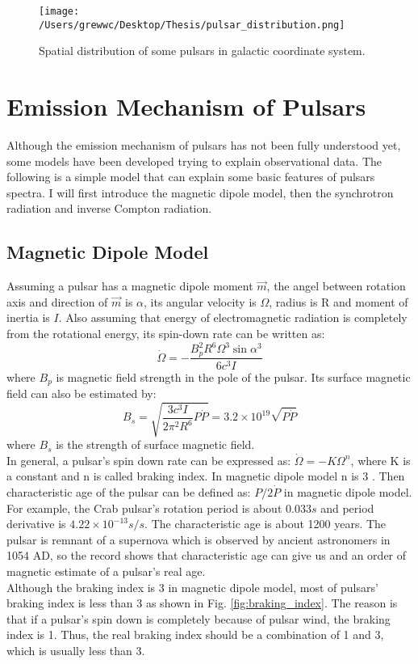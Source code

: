 \documentclass[12pt]{report}
\begin{document}
    \begin{figure}[h]
      \centering
      \texttt{[image: /Users/grewwc/Desktop/Thesis/pulsar\_distribution.png]}
      \caption{Spatial distribution of some pulsars in galactic coordinate system.}
      \label{fig: spatial_distribution}
    \end{figure}
    
    \section{Emission Mechanism of Pulsars}
      Although the emission mechanism of pulsars has not been fully understood yet, some 
      models have been developed 
      trying to explain observational data. The following is a simple model that can explain 
      some basic features of pulsars spectra. I will first introduce the magnetic dipole model, 
      then the synchrotron radiation and inverse Compton radiation. 
      
      \subsection{Magnetic Dipole Model}
        Assuming a pulsar has a magnetic dipole moment $\vec{m}$, the angel between rotation axis and 
        direction of 
        $\vec{m}$ is $\alpha$, its angular velocity is $\Omega$, radius is R and moment of inertia is $I$. 
        Also assuming that energy of electromagnetic radiation is completely from the rotational energy, 
        its spin-down rate can be written as: 
        $$
            \dot{\Omega}=-\frac{B_p^2 R^6 \Omega^3 \sin{\alpha}^3}{6c^3I}
        $$
        where $B_p$ is magnetic field strength in the pole of the pulsar. Its surface magnetic field can 
        also be estimated by:
        $$
            B_s=\sqrt{\frac{3c^3I}{2\pi^2R^6}P\dot{P}}=3.2\times 10^{19}\sqrt{P\dot{P}}
        $$
        where $B_s$ is the strength of surface magnetic field. \\
        \indent In general, a pulsar's spin down rate can be expressed as: $\dot{\Omega}=-K\Omega^{n}$, 
        where K is a constant and n is called braking index. In magnetic dipole model n is 
        3 \cite{Tong2015}. Then characteristic age of the pulsar can be defined as: 
        $P/2\dot{P}$ in magnetic dipole model. For example, the Crab 
        pulsar's rotation period is about $0.033s$ and period derivative is 
        $4.22\times 10^{-13}s/s$. The characteristic age is about 1200 years. The pulsar 
        is remnant of a supernova which is observed by ancient astronomers in 1054 
        AD, so the record shows that characteristic age can give us and an order of magnetic 
        estimate of a pulsar's real age. \\
        \indent 
        Although the braking index is 3 in magnetic dipole model, most of pulsars' braking 
        index is less than 3 as shown in Fig. \ref{fig:braking_index}. The reason is that if
        a pulsar's spin down is completely because of pulsar wind, the braking index is 1. 
        Thus, the real braking index should be a combination of 1 and 3, which is usually 
        less than 3. \cite{PhysRevD.91.063007}
        
\end{document}
